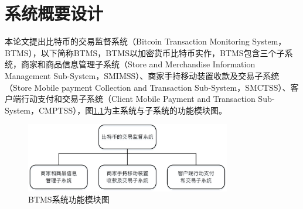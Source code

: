 \chapter{系统概要设计} 


	本论文提出比特币的交易监督系统（Bitcoin Transaction Monitoring System，BTMS）\supercite{Blockchain-basedpaymentcollectionsupervisionsystemusingpervasiveBitcoindigitalwallet}，以下简称BTMS，BTMS以加密货币比特币实作，BTMS包含三个子系统，商家和商品信息管理子系统（Store and Merchandise Information Management Sub-System，SMIMSS）、商家手持移动装置收款及交易子系统（Store Mobile payment Collection and Transaction Sub-System，SMCTSS）、客户端行动支付和交易子系统（Client Mobile Payment and Transaction Sub-System，CMPTSS），图\ref{model0}为主系统与子系统的功能模块图。

	\begin{figure}[!htbp]
		\centering
		\includegraphics[width = 0.8\textwidth]{model0.jpg}
		\caption{BTMS系统功能模块图}\label{model0}
	\end{figure}

